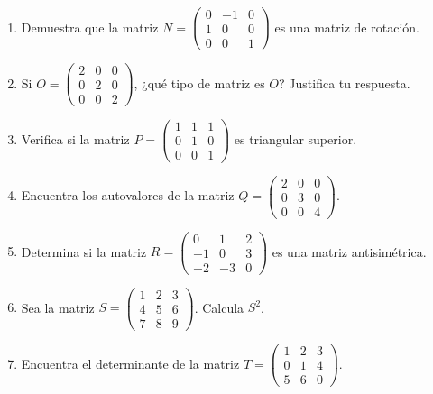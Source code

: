 \documentclass[10pt,a4paper]{article}
\begin{document}
\begin{enumerate}[resume]
    \item Demuestra que la matriz $N = \begin{pmatrix} 0 & -1 & 0 \\ 1 & 0 & 0 \\ 0 & 0 & 1 \end{pmatrix}$ es una matriz de rotación.

    \item Si $O = \begin{pmatrix} 2 & 0 & 0 \\ 0 & 2 & 0 \\ 0 & 0 & 2 \end{pmatrix}$, ¿qué tipo de matriz es $O$? Justifica tu respuesta.

    \item Verifica si la matriz $P = \begin{pmatrix} 1 & 1 & 1 \\ 0 & 1 & 0 \\ 0 & 0 & 1 \end{pmatrix}$ es triangular superior.

    \item Encuentra los autovalores de la matriz $Q = \begin{pmatrix} 2 & 0 & 0 \\ 0 & 3 & 0 \\ 0 & 0 & 4 \end{pmatrix}$.

    \item Determina si la matriz $R = \begin{pmatrix} 0 & 1 & 2 \\ -1 & 0 & 3 \\ -2 & -3 & 0 \end{pmatrix}$ es una matriz antisimétrica.

    \item Sea la matriz $S = \begin{pmatrix} 1 & 2 & 3 \\ 4 & 5 & 6 \\ 7 & 8 & 9 \end{pmatrix}$. Calcula $S^2$.

    \item Encuentra el determinante de la matriz $T = \begin{pmatrix} 1 & 2 & 3 \\ 0 & 1 & 4 \\ 5 & 6 & 0 \end{pmatrix}$.

\end{enumerate}
\end{document}
